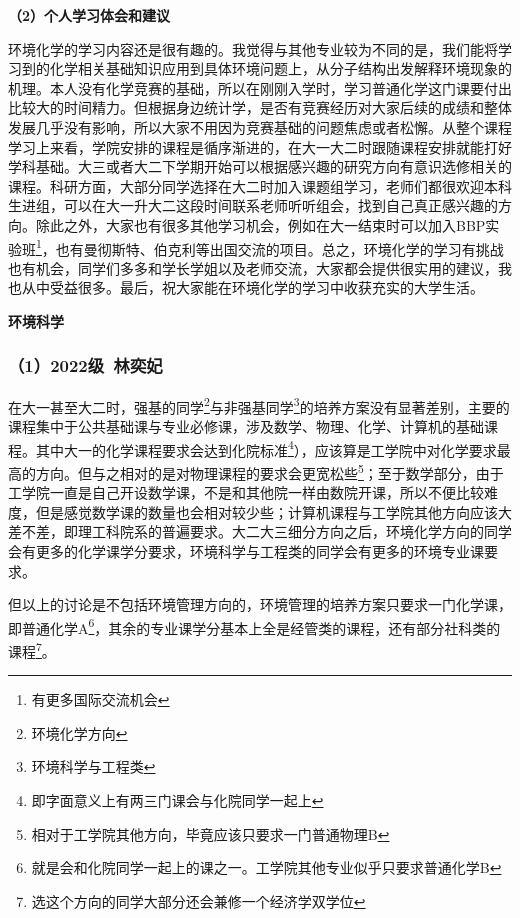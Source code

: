 \documentclass[11pt,oneside]{book}
\begin{document}
\vspace{10pt}

\textbf{（2）个人学习体会和建议}

环境化学的学习内容还是很有趣的。我觉得与其他专业较为不同的是，我们能将学习到的化学相关基础知识应用到具体环境问题上，从分子结构出发解释环境现象的机理。本人没有化学竞赛的基础，所以在刚刚入学时，学习普通化学这门课要付出比较大的时间精力。但根据身边统计学，是否有竞赛经历对大家后续的成绩和整体发展几乎没有影响，所以大家不用因为竞赛基础的问题焦虑或者松懈。从整个课程学习上来看，学院安排的课程是循序渐进的，在大一大二时跟随课程安排就能打好学科基础。大三或者大二下学期开始可以根据感兴趣的研究方向有意识选修相关的课程。科研方面，大部分同学选择在大二时加入课题组学习，老师们都很欢迎本科生进组，可以在大一升大二这段时间联系老师听听组会，找到自己真正感兴趣的方向。除此之外，大家也有很多其他学习机会，例如在大一结束时可以加入BBP实验班\footnote{有更多国际交流机会}，也有曼彻斯特、伯克利等出国交流的项目。总之，环境化学的学习有挑战也有机会，同学们多多和学长学姐以及老师交流，大家都会提供很实用的建议，我也从中受益很多。最后，祝大家能在环境化学的学习中收获充实的大学生活。

\vspace{10pt}

\textbf{环境科学}

\subsubsection{（1）2022级\ 林奕妃}

在大一甚至大二时，强基的同学\footnote{环境化学方向}与非强基同学\footnote{环境科学与工程类}的培养方案没有显著差别，主要的课程集中于公共基础课与专业必修课，涉及数学、物理、化学、计算机的基础课程。其中大一的化学课程要求会达到化院标准\footnote{即字面意义上有两三门课会与化院同学一起上}），应该算是工学院中对化学要求最高的方向。但与之相对的是对物理课程的要求会更宽松些\footnote{相对于工学院其他方向，毕竟应该只要求一门普通物理B}；至于数学部分，由于工学院一直是自己开设数学课，不是和其他院一样由数院开课，所以不便比较难度，但是感觉数学课的数量也会相对较少些；计算机课程与工学院其他方向应该大差不差，即理工科院系的普遍要求。大二大三细分方向之后，环境化学方向的同学会有更多的化学课学分要求，环境科学与工程类的同学会有更多的环境专业课要求。

\vspace{10pt}

但以上的讨论是不包括环境管理方向的，环境管理的培养方案只要求一门化学课，即普通化学A\footnote{就是会和化院同学一起上的课之一。工学院其他专业似乎只要求普通化学B}，其余的专业课学分基本上全是经管类的课程，还有部分社科类的课程\footnote{选这个方向的同学大部分还会兼修一个经济学双学位}。
\end{document}
